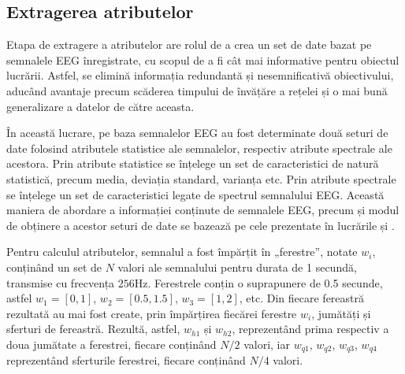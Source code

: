 \subsection{Extragerea atributelor}
Etapa de extragere a atributelor are rolul de a crea un set de date bazat pe semnalele EEG înregistrate, cu scopul de a fi cât mai informative pentru obiectul lucrării. Astfel, se elimină informația redundantă și nesemnificativă obiectivului, aducând avantaje precum scăderea timpului de învățăre a rețelei și o mai bună generalizare a datelor de către aceasta.

În această lucrare, pe baza semnalelor EEG au fost determinate două seturi de date folosind atributele statistice ale semnalelor, respectiv atribute spectrale ale acestora. Prin atribute statistice se înțelege un set de caracteristici de natură statistică, precum media, deviația standard, varianța etc. Prin atribute spectrale se înțelege un set de caracteristici legate de spectrul semnalului EEG. Această maniera de abordare a informației conținute de semnalele EEG, precum și modul de obținere a acestor seturi de date se bazează pe cele prezentate în lucrările \cite{eeg-cnn:2020} și \cite{eeg:2018}.

Pentru calculul atributelor, semnalul a fost împărțit în „ferestre”, notate $w_i$, conținând un set de $N$ valori ale semnalului pentru durata de 1 secundă, transmise cu frecvența $256\si{\hertz}$. Ferestrele conțin o suprapunere de 0.5 secunde, astfel $w_1=[0,1]$, $w_2=[0.5,1.5]$, $w_3=[1,2]$, etc. Din fiecare fereastră rezultată au mai fost create, prin împărțirea fiecărei ferestre $w_i$, jumătăți și sferturi de fereastră. Rezultă, astfel, $w_{h1}$ și $w_{h2}$, reprezentând prima respectiv a doua jumătate a ferestrei, fiecare conținând $N/2$ valori, iar $w_{q1}$, $w_{q2}$, $w_{q3}$, $w_{q4}$ reprezentând sferturile ferestrei, fiecare conținând $N/4$ valori.

